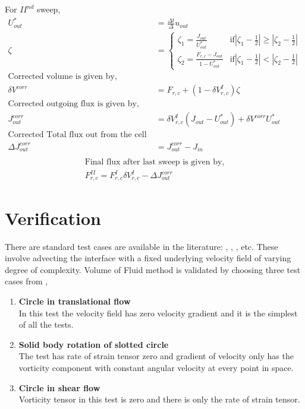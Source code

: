 For $II^{nd}$ sweep, 
\begin{equation*}
 \begin{align}
U^*_{out}  &= \frac{\Delta t}{\Delta}u_{out} \\
 \zeta &=
\begin{cases}
 \zeta_1 = \frac{J_{out}}{U^*_{out}} & \text{if} |\zeta_1-\frac{1}{2}| \geqslant  |\zeta_2-\frac{1}{2}| \\
\zeta_2 = \frac{F_{r,c}-J_{out}}{1-U^*_{out}} & \text{if} |\zeta_1-\frac{1}{2}| <  |\zeta_2-\frac{1}{2}| 
\end{cases} \\
\text{Corrected volume is given by,} \\
\delta V^{corr} &= F_{r,c} + (1-\delta V_{r,c}^I)\zeta \\
\text{Corrected outgoing flux is given by,} \\
J_{out}^{corr} &=  \delta V_{r,c}^I (J_{out}-U^*_{out}) + \delta V^{corr} U^*_{out} \\
\text{Corrected Total flux out from the cell is given by }\\
 \Delta J_{out}^{corr} &= J_{out}^{corr} - J_{in} \\
 \end{align}
 \end{equation*}
 \begin{equation*}
 \begin{align}
 \text{Final flux after last sweep is given by,}\\
 \boxed{F_{r,c}^{II} = F_{r,c}^{I} \delta V_{r,c}^I -  \Delta J_{out}^{corr}}
 \end{align}
\end{equation*}
\section{Verification}
There are standard test cases are available in the literature: \cite{Zalesak1979}, \cite{Puckett1997}, \cite{Anton2001}, \cite{Gerlach2006} etc.
These involve advecting the interface with a fixed underlying velocity field of varying degree of complexity.
Volume of Fluid method is validated by choosing three test cases from \cite{Rudman1997}, 

\begin{enumerate}
 \item \textbf{Circle in translational flow} \\
 In this test the velocity field has zero velocity gradient and it is the simplest of all the tests.
 \item \textbf{Solid body rotation of slotted circle} \\
 The test has rate of strain tensor zero and gradient of velocity only has the vorticity component with constant angular velocity at every point in space.
 \item \textbf{Circle in shear flow} \\
Vorticity tensor in this test is zero and there is only the rate of strain tensor.
\end{enumerate}

